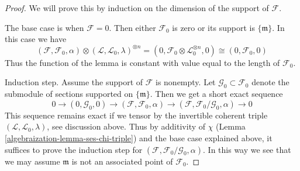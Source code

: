 \begin{proof}

We will prove this by induction on the dimension of the support of
$\mathcal{F}$.

\medskip\noindent
The base case is when $\mathcal{F} = 0$. Then either
$\mathcal{F}_0$ is zero or its support is $\{\mathfrak m\}$.
In this case we have
$$
(\mathcal{F}, \mathcal{F}_0, \alpha) \otimes
(\mathcal{L}, \mathcal{L}_0, \lambda)^{\otimes n} =
(0, \mathcal{F}_0 \otimes \mathcal{L}_0^{\otimes n}, 0) \cong
(0, \mathcal{F}_0, 0)
$$
Thus the function of the lemma is constant with value equal
to the length of $\mathcal{F}_0$.

\medskip\noindent
Induction step. Assume the support of $\mathcal{F}$ is nonempty.
Let $\mathcal{G}_0 \subset \mathcal{F}_0$ denote the submodule
of sections supported on $\{\mathfrak m\}$. Then we get a short
exact sequence
$$
0 \to (0, \mathcal{G}_0, 0) \to
(\mathcal{F}, \mathcal{F}_0, \alpha) \to
(\mathcal{F}, \mathcal{F}_0/\mathcal{G}_0, \alpha) \to 0
$$
This sequence remains exact if we tensor by the invertible
coherent triple $(\mathcal{L}, \mathcal{L}_0, \lambda)$, see
discussion above. Thus by additivity of $\chi$
(Lemma \ref{algebraization-lemma-ses-chi-triple})
and the base case explained above, it suffices to prove
the induction step for
$(\mathcal{F}, \mathcal{F}_0/\mathcal{G}_0, \alpha)$.
In this way we see that we may assume $\mathfrak m$ is not
an associated point of $\mathcal{F}_0$.


\end{proof}
